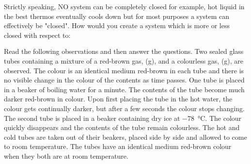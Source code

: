 \documentclass[fleqn]{exam}
\begin{document}
\begin{questions}

  \question Strictly speaking, NO system can be completely closed for example, hot liquid in the best thermos eventually cools down but for most purposes a system can effectively be "closed". How would you create a system which is more or less closed with respect to:
  \question Read the following observations and then answer the questions. \newline
  Two sealed glass tubes containing a mixture of a red-brown gas, (g), and a colourless gas, (g), are observed. The colour is an identical medium red-brown in each tube and there is no visible change in the colour of the contents as time passes.
  \newline
  One tube is placed in a beaker of boiling water for a minute. The contents of the tube become much darker red-brown in colour. Upon first placing the tube in the hot water, the colour gets continually darker, but after a few seconds the colour stops changing.
  \newline
  The second tube is placed in a beaker containing dry ice at \qty{-78}{\degreeCelsius}. The colour quickly disappears and the contents of the tube remain colourless. The hot and cold tubes are taken out of their beakers, placed side by side and allowed to come to room temperature. The tubes have an identical medium red-brown colour when they both are at room temperature.
\end{questions}
\end{document}

